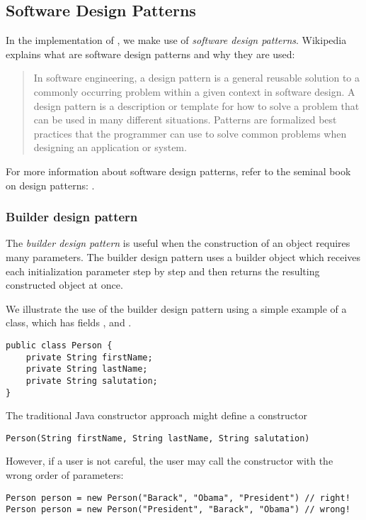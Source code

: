 \subsection{Software Design Patterns}

In the implementation of \scs,
we make use of \emph{software design patterns}.
Wikipedia explains what are software design patterns
and why they are used:
\begin{quotation}
In software engineering,
a design pattern is a general reusable solution
to a commonly occurring problem within a given context in software design.
A design pattern is a description or template
for how to solve a problem that can be used in many different situations.
Patterns are formalized best practices
that the programmer can use to solve common problems
when designing an application or system.
\end{quotation}

For more information about software design patterns,
refer to the seminal book on design patterns: \cite{gang-of-four-1994}.





\subsubsection{Builder design pattern}

The \emph{builder design pattern}
is useful when the construction of an object requires many parameters.
The builder design pattern uses a builder object
which receives each initialization parameter step by step
and then returns the resulting constructed object at once.

We illustrate the use of the builder design pattern using a simple example
of a  class,
which has fields ,  and .

\begin{lstlisting}
public class Person {
    private String firstName;
    private String lastName;
    private String salutation;
}
\end{lstlisting}

The traditional Java constructor approach might define a constructor
\begin{lstlisting}
Person(String firstName, String lastName, String salutation)
\end{lstlisting}
However, if a user is not careful,
the user may call the constructor with the wrong order of parameters:
\begin{lstlisting}
Person person = new Person("Barack", "Obama", "President") // right!
Person person = new Person("President", "Barack", "Obama") // wrong!
\end{lstlisting}

